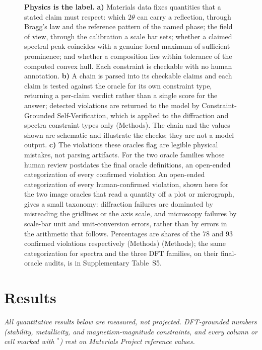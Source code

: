 \documentclass[pdflatex,sn-nature]{sn-jnl}
\newcommand{\rev}[1]{#1} %
\newcommand{\rev}[1]{{\color{blue}#1}} %
\providecommand{\DIFadd}[1]{{\protect\color{blue} \sf #1}} %
\providecommand{\DIFdel}[1]{{\protect\color{red} \scriptsize #1}} %
\providecommand{\DIFaddFL}[1]{\DIFadd{#1}} %
\providecommand{\DIFdelFL}[1]{\DIFdel{#1}} %
\providecommand{\DIFaddbeginFL}{} %
\providecommand{\DIFaddendFL}{} %
\providecommand{\DIFdelbeginFL}{} %
\providecommand{\DIFdelendFL}{} %
\providecommand{\DIFscaledelfig}{0.5}
\newlength{\DIFdelgraphicswidth} %
\newlength{\DIFdelgraphicsheight} %
\providecommand{\DIFaddincludegraphics}[2][]{{\color{blue}\fbox{\DIFOincludegraphics[#1]{#2}}}} %
\providecommand{\DIFdelincludegraphics}[2][]{%
\sbox{\DIFdelgraphicsbox}{\DIFOincludegraphics[#1]{#2}}%
\settoboxwidth{\DIFdelgraphicswidth}{\DIFdelgraphicsbox} %
\settoboxtotalheight{\DIFdelgraphicsheight}{\DIFdelgraphicsbox} %
\scalebox{\DIFscaledelfig}{%
\parbox[b]{\DIFdelgraphicswidth}{\usebox{\DIFdelgraphicsbox}\\[-\baselineskip] \rule{\DIFdelgraphicswidth}{0em}}\llap{\resizebox{\DIFdelgraphicswidth}{\DIFdelgraphicsheight}{%
\setlength{\unitlength}{\DIFdelgraphicswidth}%
\begin{picture}(1,1)%
\thicklines\linethickness{2pt} %
{\color[rgb]{1,0,0}\put(0,0){\framebox(1,1){}}}%
{\color[rgb]{1,0,0}\put(0,0){\line( 1,1){1}}}%
{\color[rgb]{1,0,0}\put(0,1){\line(1,-1){1}}}%
\end{picture}%
}\hspace*{3pt}}} %
} %
\DeclareRobustCommand{\DIFaddbeginFL}{\DIFOaddbeginFL \let\includegraphics\DIFaddincludegraphics} %
\DeclareRobustCommand{\DIFaddendFL}{\DIFOaddendFL \let\includegraphics\DIFOincludegraphics} %
\DeclareRobustCommand{\DIFdelbeginFL}{\DIFOdelbeginFL \let\includegraphics\DIFdelincludegraphics} %
\DeclareRobustCommand{\DIFdelendFL}{\DIFOaddendFL \let\includegraphics\DIFOincludegraphics} %
\begin{document}
\begin{figure}[t]
\DIFaddendFL \caption{\justifying\textbf{Physics is the label.} \textbf{a)} Materials data fixes quantities that a stated claim must respect: which $2\theta$ can carry a reflection, through Bragg's law and the reference pattern of the named phase; the field of view, through the calibration a scale bar sets; whether a claimed spectral peak coincides with a genuine local maximum of sufficient prominence; and whether a composition lies within tolerance of the computed convex hull. Each constraint is checkable with no human annotation. \textbf{b)} A chain is parsed into its checkable claims and each claim is tested against the oracle for its own constraint type, returning a per-claim verdict rather than a single score for the answer; detected violations are returned to the model by Constraint-Grounded Self-Verification, which is applied to the diffraction and spectra constraint types only (Methods). The chain and the values shown are schematic and illustrate the checks; they are not a model output. \textbf{c)} The violations these oracles flag are legible physical mistakes, not parsing artifacts. \DIFdelbeginFL \DIFdelFL{For the two oracle families whose human review postdates the final oracle definitions, an open-ended categorization of every confirmed violation }\DIFdelendFL \DIFaddbeginFL \DIFaddFL{\rev{An open-ended categorization of every human-confirmed violation, shown here for the two image oracles that read a quantity off a plot or micrograph,} }\DIFaddendFL gives a small taxonomy: diffraction failures are dominated by misreading the gridlines or the axis scale, and microscopy failures by scale-bar unit and unit-conversion errors, rather than by errors in the arithmetic that follows. Percentages are shares of the 78 and 93 confirmed violations respectively \DIFdelbeginFL \DIFdelFL{(Methods)}\DIFdelendFL \DIFaddbeginFL \DIFaddFL{\rev{(Methods); the same categorization for spectra and the three DFT families, on their final-oracle audits, is in Supplementary Table~S5}}\DIFaddendFL .}
\label{fig:teaser}
\end{figure}

\section*{Results}
\emph{All quantitative results below are measured, not projected. DFT-grounded
numbers (stability, metallicity, and magnetism-magnitude constraints, and every column or
cell marked with $^{*}$) rest on Materials Project reference values.}
\end{document}
